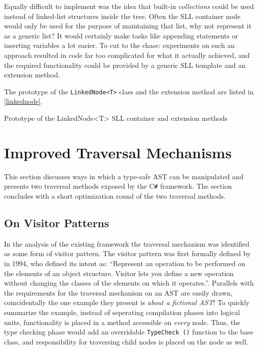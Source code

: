 \documentclass[twoside,openright]{uva-bachelor-thesis}
\newcommand{\code}[1]{\texttt{\footnotesize#1}}
\newcommand{\cs}{C\texttt{\#}\xspace}
\begin{document}
		Equally difficult to implement was the idea that built-in \emph{collections} could be used instead of linked-list structures inside the tree. Often the SLL container node would only be used for the purpose of maintaining that list, why not represent it as a generic list? It would certainly make tasks like appending statements or inserting variables a lot easier. To cut to the chase: experiments on such an approach resulted in code far too complicated for what it actually achieved, and the required functionality could be provided by a generic SLL template and an extension method.
		
		The prototype of the \code{LinkedNode<T>} class and the extension method are listed in \cref{linkednode}. 
		
		\begin{codebox}[label=linkednode]{Prototype of the LinkedNode<T> SLL container and extension methods}
		\end{codebox}
									
					
	\section{Improved Traversal Mechanisms}
		This section discusses ways in which a type-safe AST can be manipulated and presents two traversal methods exposed by the \cs framework. The section concludes with a short optimization round of the two traversal methods.
		
		\subsection{On Visitor Patterns}			
			In the analysis of the existing framework the traversal mechanism was identified as some form of visitor pattern. The visitor pattern was first formally defined by \citeauthor{gof1994} in 1994, who defined its intent as: ``Represent an operation to be performed on the elements of an object structure. Visitor lets you define a new operation without changing the classes of the elements on which it operates.''. Parallels with the requirements for the traversal mechanism on an AST are easily drawn, coincidentally the one example they present is \emph{about a fictional AST}! To quickly summarize the example, instead of seperating compilation phases into logical units, functionality is placed in a method accessible on \emph{every} node. Thus, the type checking phase would add an overridable \code{TypeCheck ()} function to the base class, and responsibility for traversing child nodes is placed on the node as well.
			
\end{document}
